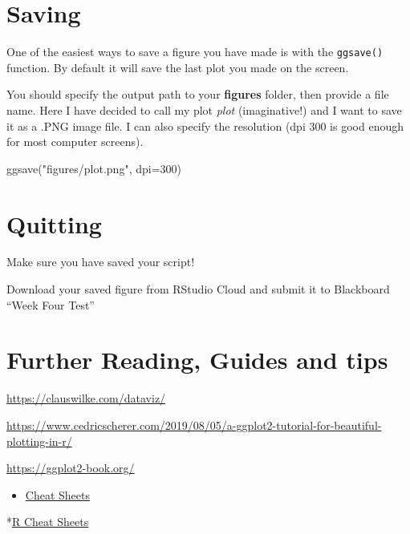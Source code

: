 \documentclass[
]{book}
\makeatletter
\newenvironment{Shaded}{\begin{snugshade}}{\end{snugshade}}
\newcommand{\AttributeTok}[1]{\textcolor[rgb]{0.77,0.63,0.00}{#1}}
\newcommand{\DecValTok}[1]{\textcolor[rgb]{0.00,0.00,0.81}{#1}}
\newcommand{\FunctionTok}[1]{\textcolor[rgb]{0.00,0.00,0.00}{#1}}
\newcommand{\NormalTok}[1]{#1}
\newcommand{\StringTok}[1]{\textcolor[rgb]{0.31,0.60,0.02}{#1}}
\providecommand{\tightlist}{%
  \setlength{\itemsep}{0pt}\setlength{\parskip}{0pt}}
\newenvironment{kframe}{%
\medskip{}
\setlength{\fboxsep}{.8em}
 \def\at@end@of@kframe{}%
 \ifinner\ifhmode%
  \def\at@end@of@kframe{\end{minipage}}%
  \begin{minipage}{\columnwidth}%
 \fi\fi%
 \def\FrameCommand##1{\hskip\@totalleftmargin \hskip-\fboxsep
 \colorbox{shadecolor}{##1}\hskip-\fboxsep
     \hskip-\linewidth \hskip-\@totalleftmargin \hskip\columnwidth}%
 \MakeFramed {\advance\hsize-\width
   \@totalleftmargin\z@ \linewidth\hsize
   \@setminipage}}%
 {\par\unskip\endMakeFramed%
 \at@end@of@kframe}
\newenvironment{block}[1]
  {
  \begin{itemize}
  \renewcommand{\labelitemi}{
    \raisebox{-.7\height}[0pt][0pt]{
      {\setkeys{Gin}{width=3em,keepaspectratio}\texttt{[image: images/\#1]}}
    }
  }
  \setlength{\fboxsep}{1em}
  \begin{kframe}
  \item
  }
  {
  \end{kframe}
  \end{itemize}
  }
\newenvironment{rmdquestion}
  {\begin{block}{question}}
  {\end{block}}
\newenvironment{rmdwarning}
  {\begin{block}{warning}}
  {\end{block}}
\makeatother
\begin{document}
\hypertarget{saving}{%
\section{Saving}\label{saving}}

One of the easiest ways to save a figure you have made is with the \texttt{ggsave()} function. By default it will save the last plot you made on the screen.

You should specify the output path to your \textbf{figures} folder, then provide a file name. Here I have decided to call my plot \emph{plot} (imaginative!) and I want to save it as a .PNG image file. I can also specify the resolution (dpi 300 is good enough for most computer screens).

\begin{Shaded}
\begin{Highlighting}[]
\FunctionTok{ggsave}\NormalTok{(}\StringTok{"figures/plot.png"}\NormalTok{, }\AttributeTok{dpi=}\DecValTok{300}\NormalTok{)}
\end{Highlighting}
\end{Shaded}

\hypertarget{quitting-3}{%
\section{Quitting}\label{quitting-3}}

\begin{rmdwarning}
Make sure you have saved your script!
\end{rmdwarning}

\begin{rmdquestion}
Download your saved figure from RStudio Cloud and submit it to
Blackboard ``Week Four Test''
\end{rmdquestion}

\hypertarget{further-reading-guides-and-tips}{%
\section{Further Reading, Guides and tips}\label{further-reading-guides-and-tips}}

\url{https://clauswilke.com/dataviz/}

\url{https://www.cedricscherer.com/2019/08/05/a-ggplot2-tutorial-for-beautiful-plotting-in-r/}

\url{https://ggplot2-book.org/}

\begin{itemize}
\tightlist
\item
  \href{https://www.rstudio.com/resources/cheatsheets/}{Cheat Sheets}
\end{itemize}

*\href{https://www.rstudio.com/resources/cheatsheets/}{R Cheat Sheets}

  
\end{document}
